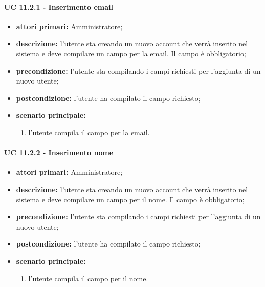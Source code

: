 			\paragraph{UC 11.2.1 - Inserimento email}
			\begin{itemize}
				\item \textbf{attori primari:} Amministratore;
				\item \textbf{descrizione:} l'utente sta creando un nuovo account che verrà inserito nel sistema e deve compilare un campo per la email. Il campo è obbligatorio;
				\item \textbf{precondizione:} l'utente sta compilando i campi richiesti per l'aggiunta di un nuovo utente;
				\item \textbf{postcondizione:} l'utente ha compilato il campo richiesto;
				\item \textbf{scenario principale:}
				\begin{enumerate}
					\item{l'utente compila il campo per la email.}
				\end{enumerate}	
			\end{itemize}

			\paragraph{UC 11.2.2 - Inserimento nome}
			\begin{itemize}
				\item \textbf{attori primari:} Amministratore;
				\item \textbf{descrizione:} l'utente sta creando un nuovo account che verrà inserito nel sistema e deve compilare un campo per il nome. Il campo è obbligatorio;
				\item \textbf{precondizione:} l'utente sta compilando i campi richiesti per l'aggiunta di un nuovo utente;
				\item \textbf{postcondizione:} l'utente ha compilato il campo richiesto;
				\item \textbf{scenario principale:}
				\begin{enumerate}
					\item{l'utente compila il campo per il nome.}
				\end{enumerate}	
			\end{itemize}

